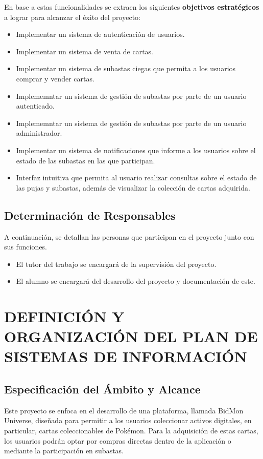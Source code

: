 En base a estas funcionalidades se extraen los siguientes \textbf{objetivos estratégicos} a lograr para alcanzar el éxito del proyecto:

\begin{itemize}
    \item Implementar un sistema de autenticación de usuarios.
    \item Implementar un sistema de venta de cartas.
    \item Implementar un sistema de subastas ciegas que permita a los usuarios comprar y vender cartas.
    \item Implememntar un sistema de gestión de subastas por parte de un usuario autenticado.
    \item Implememntar un sistema de gestión de subastas por parte de un usuario administrador.
    \item Implementar un sistema de notificaciones que informe a los usuarios sobre el estado de las subastas en las que participan.
    \item Interfaz intuitiva que permita al usuario realizar consultas sobre el estado de las pujas y subastas, además de visualizar la colección de cartas adquirida.
\end{itemize}

\subsection{Determinación de Responsables}
A continuación, se detallan las personas que participan en el proyecto junto con sus funciones.
\begin{itemize}
    \item El tutor del trabajo se encargará de la supervisión del proyecto.
    \item El alumno se encargará del desarrollo del proyecto y documentación de este. 
\end{itemize}

\newpage
\section{DEFINICIÓN Y ORGANIZACIÓN DEL PLAN DE SISTEMAS DE INFORMACIÓN}
 

\subsection{Especificación del Ámbito y Alcance} \label{sec:2_2_1-Especificacion_ambito_alcance}
\hypertarget{sec:2_2_1-Especificacion_ambito_alcance}{}
Este proyecto se enfoca en el desarrollo de una plataforma, llamada BidMon Universe, diseñada para permitir a los usuarios coleccionar activos digitales, en particular, cartas coleccionables de Pokémon. 
Para la adquisición de estas cartas, los usuarios podrán optar por compras directas dentro de la aplicación o mediante la participación en subastas.


